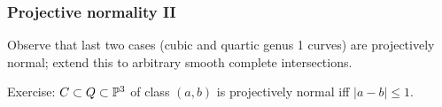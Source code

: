 \subsubsection{Projective normality II}
Observe that last two cases (cubic and quartic genus 1 curves) are projectively normal; extend this to arbitrary smooth complete intersections.

Exercise: $C \subset Q \subset {\mathbb P}^3$ of class $(a,b)$ is projectively normal iff $|a-b| \leq 1$.





